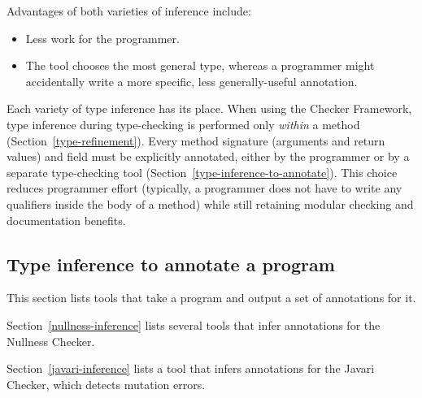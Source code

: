 Advantages of both varieties of inference include:
\begin{itemize}
\item
  Less work for the programmer.
\item
  The tool chooses the most general type, whereas a programmer might
  accidentally write a more specific, less generally-useful annotation.
\end{itemize}


Each variety of type inference has its place.  When using the Checker
Framework, type inference during type-checking is performed only
\emph{within} a method (Section~\ref{type-refinement}).  Every method
signature (arguments and return values) and field must be explicitly annotated,
either by the programmer or by a separate type-checking tool
(Section~\ref{type-inference-to-annotate}).  This choice reduces programmer
effort (typically, a programmer does not have to write any qualifiers
inside the body of a method) while still retaining modular checking and
documentation benefits.


\subsection{Type inference to annotate a program\label{type-inference-to-annotate}}

This section lists tools that take a program and output a set of
annotations for it.

Section~\ref{nullness-inference} lists several tools that infer
annotations for the Nullness Checker.

Section~\ref{javari-inference} lists a tool that infers
annotations for the Javari Checker, which detects mutation errors.


